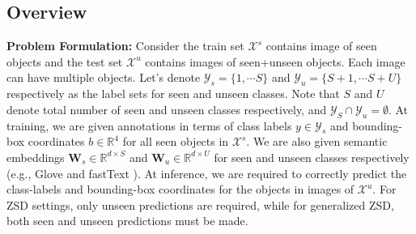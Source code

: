 \documentclass[runningheads]{llncs}
\begin{document}
\subsection{Overview}
\noindent \textbf{Problem Formulation:} Consider the train set $ \mathcal{X}^{s}$  contains image of seen objects and the test set  $\mathcal{X}^{u}$ contains images of seen+unseen objects. Each image can have multiple objects.  Let's denote $\mathcal{Y}_s =\{1,\cdots S\}$ and $\mathcal{Y}_u =\{S+1, \cdots S+U\}$ respectively as the label sets for seen and unseen classes. Note that $S$ and $U$ denote total number of seen and unseen classes respectively, and $\mathcal{Y}_S \cap \mathcal{Y}_u = \emptyset$. At training, we are given annotations in terms of class labels $y \in \mathcal{Y}_s$ and bounding-box coordinates $b \in \mathbb{R}^{4}$ for all seen objects in $ \mathcal{X}^{s}$. We are also given semantic embeddings $\mathbf{W}_s \in \mathbb{R}^{d\times S}$ and $\mathbf{W}_u \in \mathbb{R}^{d\times U}$ for seen and unseen classes respectively (e.g., Glove \cite{pennington2014glove} and fastText \cite{joulin2017bag}). At inference, we are required to correctly predict the class-labels and bounding-box coordinates for the objects in images of $\mathcal{X}^{u}$. For ZSD settings, only unseen predictions are required, while for generalized ZSD, both seen and unseen predictions must be made.
\end{document}
